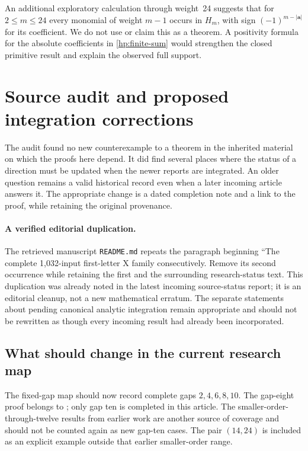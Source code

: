 \documentclass[11pt,a4paper]{article}
\theoremstyle{definition}
\theoremstyle{remark}
\numberwithin{equation}{section}
\newcommand{\file}[1]{\nolinkurl{#1}}
\begin{document}
An additional exploratory calculation through weight~24 suggests
that for $2\le m\le24$ every monomial of weight $m-1$ occurs in
$H_m$, with sign
$(-1)^{m-|\boldsymbol a|}$ for its coefficient. We do not use or
claim this as a theorem. A positivity formula for the absolute
coefficients in \eqref{hp:finite-sum} would strengthen the
closed primitive result and explain the observed full support.

\section{Source audit and proposed integration corrections}
\label{audit:section}

The audit found no new counterexample to a theorem in the inherited
material on which the proofs here depend. It did find several places
where the status of a direction must be updated when the newer reports
are integrated. An older question remains a valid historical record
even when a later incoming article answers it. The appropriate change
is a dated completion note and a link to the proof, while retaining
the original provenance.

\paragraph{A verified editorial duplication.}
The retrieved manuscript \file{README.md} repeats the paragraph beginning
``The complete 1,032-input first-letter X family consecutively.
Remove its second occurrence while retaining the first and the surrounding
research-status text. This duplication was already noted in the latest
incoming source-status report; it is an editorial cleanup, not a new
mathematical erratum. The separate statements about pending canonical
analytic integration remain appropriate and should not be rewritten as
though every incoming result had already been incorporated.

\subsection{What should change in the current research map}

The fixed-gap map should now record complete gaps $2,4,6,8,10$.
The gap-eight proof belongs to \cite{PolygammaResonances}; only gap ten
is completed in this article. The smaller-order-through-twelve results
from earlier work are another source of coverage and should not be
counted again as new gap-ten cases. The pair $(14,24)$ is included as
an explicit example outside that earlier smaller-order range.
\end{document}

